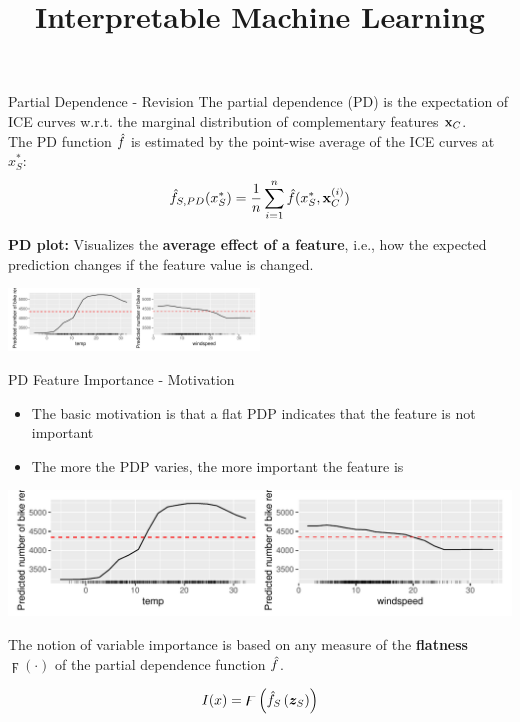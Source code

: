 \documentclass[11pt,compress,t,notes=noshow, aspectratio=169, xcolor=table]{beamer}
\title{Interpretable Machine Learning}
\date{}
\begin{document}
\newcommand{\titlefigure}{figure_man/pdps_bike}
\newcommand{\learninggoals}{
\item Introduction to PDP feature importance
\item Numerical and Categorical Measures of flatness
}


\begin{vbframe}{Partial Dependence - Revision}
The partial dependence (PD) is the expectation of ICE curves w.r.t. the marginal distribution of complementary features $\xv_C$.\\
The PD function $\fh$ is estimated by the point-wise average of the ICE curves at $x_S^*$:
$$\fh_{S, PD}(x_S^*) = \frac{1}{n} \sum_{i=1}^n \fh(x_S^*, \xv_C^{(i)})$$



\textbf{PD plot:} Visualizes the \textbf{average effect of a feature},
  i.e., how the expected prediction changes if the feature value is changed.
\begin{center}
\includegraphics[width=0.5\textwidth]{figure_man/pdps_bike}
\end{center}
\end{vbframe}

\begin{vbframe}{PD Feature Importance - Motivation}
\begin{itemize}
    \item The basic motivation is that a flat PDP indicates that the feature is not important
    \item The more the PDP varies, the more important the feature is
\end{itemize}

\begin{center}
\includegraphics[width=1\textwidth]{figure_man/pdps_bike}
\end{center}

The notion of variable importance is based on any measure of the \textbf{flatness} $\digamma(\cdot)$ of the partial dependence function $\fh$.

$$
I(x)=\digamma\left(\fh_{S}\left(\boldsymbol{z}_{S}\right)\right)
$$

\end{vbframe}
\end{document}
